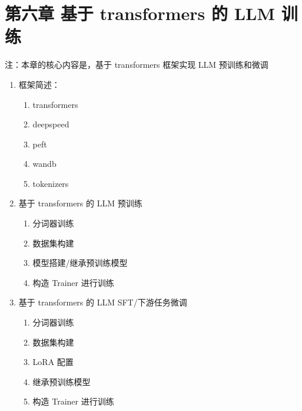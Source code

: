 \documentclass[
]{article}
\author{}
\date{}
\providecommand{\tightlist}{%
  \setlength{\itemsep}{0pt}\setlength{\parskip}{0pt}}
\begin{document}
{
\setcounter{tocdepth}{3}
\tableofcontents
}
\section{第六章 基于 transformers 的 LLM
训练}\label{ux7b2cux516dux7ae0-ux57faux4e8e-transformers-ux7684-llm-ux8badux7ec3}

注：本章的核心内容是，基于 transformers 框架实现 LLM 预训练和微调

\begin{enumerate}
\def\labelenumi{\arabic{enumi}.}
\tightlist
\item
  框架简述：

  \begin{enumerate}
  \def\labelenumii{\arabic{enumii}.}
  \tightlist
  \item
    transformers
  \item
    deepspeed
  \item
    peft
  \item
    wandb
  \item
    tokenizers
  \end{enumerate}
\item
  基于 transformers 的 LLM 预训练

  \begin{enumerate}
  \def\labelenumii{\arabic{enumii}.}
  \tightlist
  \item
    分词器训练
  \item
    数据集构建
  \item
    模型搭建/继承预训练模型
  \item
    构造 Trainer 进行训练
  \end{enumerate}
\item
  基于 transformers 的 LLM SFT/下游任务微调

  \begin{enumerate}
  \def\labelenumii{\arabic{enumii}.}
  \tightlist
  \item
    分词器训练
  \item
    数据集构建
  \item
    LoRA 配置
  \item
    继承预训练模型
  \item
    构造 Trainer 进行训练
  \end{enumerate}
\end{enumerate}
\end{document}
